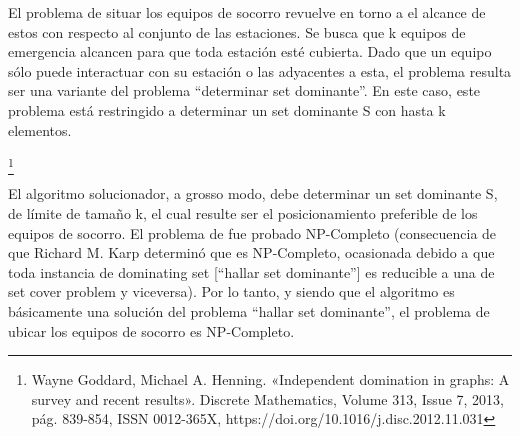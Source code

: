 \documentclass[../tp3_grupo404.tex]{subfiles}
\begin{document}
El problema de situar los equipos de socorro revuelve en torno a el alcance de estos con respecto al conjunto de las estaciones. Se busca que k equipos de emergencia alcancen para que toda estación esté cubierta. Dado que un equipo sólo puede interactuar con su estación o las adyacentes a esta, el problema resulta ser una variante del problema “determinar set dominante”. En este caso, este problema está restringido a determinar un set dominante S con hasta k elementos.

\footnote{Wayne Goddard, Michael A. Henning. «Independent domination in graphs: A survey and recent results». Discrete Mathematics, Volume 313, Issue 7, 2013, pág. 839-854,
ISSN 0012-365X, https://doi.org/10.1016/j.disc.2012.11.031}

El algoritmo solucionador, a grosso modo, debe determinar un set dominante S, de límite de tamaño k,
el cual resulte ser el posicionamiento preferible de los equipos de socorro. El problema de
 fue probado NP-Completo (consecuencia de que Richard M. Karp determinó
que  es NP-Completo, ocasionada debido a que toda instancia de
dominating set [“hallar set dominante”] es reducible a una de set cover problem y viceversa).
Por lo tanto, y siendo que el algoritmo es básicamente una solución del problema “hallar set dominante”,
el problema de ubicar los equipos de socorro es NP-Completo.

\end{document}
